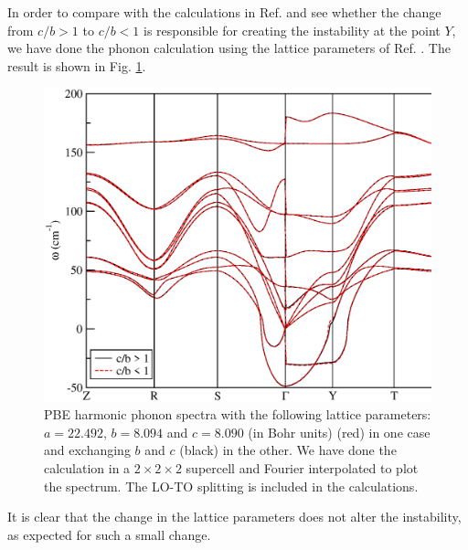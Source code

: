 In order to compare with the calculations in Ref. \cite{dewandre2016two} and see whether the change from $c/b>1$ to 
$c/b<1$ is responsible for creating the instability at the point $Y$, we have done the phonon calculation using the 
lattice parameters of Ref. \cite{dewandre2016two}. The result is shown in Fig. \ref{exchangebc}.
\begin{figure}[th]
\begin{center}
\includegraphics[width=0.8\linewidth]{Figures/exchangebc-harmonic.eps}
\caption{PBE harmonic phonon spectra with the following lattice parameters: $a=22.492$, $b=8.094$ and $c=8.090$ (in 
Bohr units) (red) in one case and exchanging $b$ and $c$ (black) in the other. We have done the calculation in a 
$2\times2\times2$ supercell and Fourier interpolated to plot the spectrum. The LO-TO splitting is included in the 
calculations.}
\label{exchangebc}
\end{center}
\end{figure}
It is clear that the change in the lattice parameters does not alter the instability, as expected for such a small 
change.
